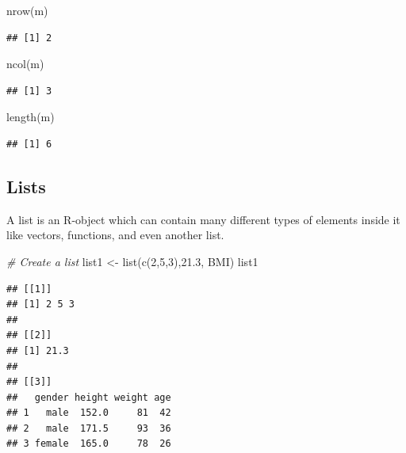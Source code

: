 \documentclass[
]{book}
\newenvironment{Shaded}{\begin{snugshade}}{\end{snugshade}}
\newcommand{\CommentTok}[1]{\textcolor[rgb]{0.56,0.35,0.01}{\textit{#1}}}
\newcommand{\DecValTok}[1]{\textcolor[rgb]{0.00,0.00,0.81}{#1}}
\newcommand{\FloatTok}[1]{\textcolor[rgb]{0.00,0.00,0.81}{#1}}
\newcommand{\FunctionTok}[1]{\textcolor[rgb]{0.00,0.00,0.00}{#1}}
\newcommand{\NormalTok}[1]{#1}
\newcommand{\OtherTok}[1]{\textcolor[rgb]{0.56,0.35,0.01}{#1}}
\begin{document}
\begin{Shaded}
\begin{Highlighting}[]
\FunctionTok{nrow}\NormalTok{(m)}
\end{Highlighting}
\end{Shaded}

\begin{verbatim}
## [1] 2
\end{verbatim}

\begin{Shaded}
\begin{Highlighting}[]
\FunctionTok{ncol}\NormalTok{(m)}
\end{Highlighting}
\end{Shaded}

\begin{verbatim}
## [1] 3
\end{verbatim}

\begin{Shaded}
\begin{Highlighting}[]
\FunctionTok{length}\NormalTok{(m)}
\end{Highlighting}
\end{Shaded}

\begin{verbatim}
## [1] 6
\end{verbatim}

\hypertarget{lists}{%
\subsection*{Lists}\label{lists}}

A list is an R-object which can contain many different types of elements inside it like vectors, functions, and even another list.

\begin{Shaded}
\begin{Highlighting}[]
\CommentTok{\# Create a list}
\NormalTok{list1 }\OtherTok{\textless{}{-}} \FunctionTok{list}\NormalTok{(}\FunctionTok{c}\NormalTok{(}\DecValTok{2}\NormalTok{,}\DecValTok{5}\NormalTok{,}\DecValTok{3}\NormalTok{),}\FloatTok{21.3}\NormalTok{, BMI)}
\NormalTok{list1}
\end{Highlighting}
\end{Shaded}

\begin{verbatim}
## [[1]]
## [1] 2 5 3
## 
## [[2]]
## [1] 21.3
## 
## [[3]]
##   gender height weight age
## 1   male  152.0     81  42
## 2   male  171.5     93  36
## 3 female  165.0     78  26
\end{verbatim}
\end{document}
